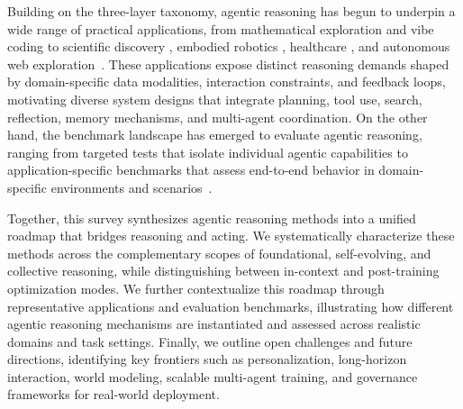 Building on the three-layer taxonomy, agentic reasoning has begun to underpin a wide range of practical applications, from mathematical exploration \cite{trinh2024solving,romera2024mathematical} and vibe coding \cite{wang2024openhands,sapkota2025vibe,karpathy2025vibecoding} to scientific discovery \cite{bran2023chemcrowaugmentinglargelanguagemodels,bousetouane2025physicalaiagentsintegrating,ding2024matexpertdecomposingmaterialsdiscovery}, embodied robotics \cite{wang2023voyager,meghan2024embodiedrag,zhao2025embodied}, healthcare \cite{li2024mmedagent,huang2025biomni}, and autonomous web exploration~\cite{li2025websailor,zheng2025skillweaver}.
These applications expose distinct reasoning demands shaped by domain-specific data modalities, interaction constraints, and feedback loops, motivating diverse system designs \cite{sapkota2025ai,liu2024dynamic} that integrate planning, tool use, search, reflection, memory mechanisms, and multi-agent coordination.
On the other hand, the benchmark landscape has emerged to evaluate agentic reasoning, ranging from targeted tests that isolate individual agentic capabilities to application-specific benchmarks that assess end-to-end behavior in domain-specific environments and scenarios~\cite{shuyan2023webarena,jing2024visualwebarena,lawrence2024videowebarena,shridhar2020alfworld,xiao2023agentbench,zhu2025multiagentbench,deng2023mind2web,gou2025mind2web2}.


Together, this survey synthesizes agentic reasoning methods into a unified roadmap that bridges reasoning and acting. We systematically characterize these methods across the complementary scopes of foundational, self-evolving, and collective reasoning, while distinguishing between in-context and post-training optimization modes. We further contextualize this roadmap through representative applications and evaluation benchmarks, illustrating how different agentic reasoning mechanisms are instantiated and assessed across realistic domains and task settings. Finally, we outline open challenges and future directions, identifying key frontiers such as personalization, long-horizon interaction, world modeling, scalable multi-agent training, and governance frameworks for real-world deployment.





